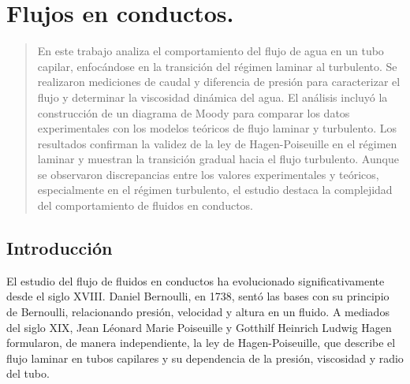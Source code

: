 



	
	\let\cleardoublepage\clearpage
	
	\frontmatter
	\tableofcontents

	
	\mainmatter
	\titleformat{\chapter}[display]
	{\normalfont\bfseries}{}{0pt}{\LARGE}
	\chapter{Flujos en conductos.}
	\begin{abstract}
	\vspace{0.5cm}
	\footnotesize{En este trabajo analiza el comportamiento del flujo de agua en un tubo capilar, enfocándose en la transición del régimen laminar al turbulento. Se realizaron mediciones de caudal y diferencia de presión para caracterizar el flujo y determinar la viscosidad dinámica del agua. El análisis incluyó la construcción de un diagrama de Moody para comparar los datos experimentales con los modelos teóricos de flujo laminar y turbulento. Los resultados confirman la validez de la ley de Hagen-Poiseuille en el régimen laminar y muestran la transición gradual hacia el flujo turbulento. Aunque se observaron discrepancias entre los valores experimentales y teóricos, especialmente en el régimen turbulento, el estudio destaca la complejidad del comportamiento de fluidos en conductos.}

	\end{abstract}
	\section{Introducción}
	
	El estudio del flujo de fluidos en conductos ha evolucionado significativamente desde el siglo XVIII. Daniel Bernoulli, en 1738, sentó las bases con su principio de Bernoulli, relacionando presión, velocidad y altura en un fluido. A mediados del siglo XIX, Jean Léonard Marie Poiseuille y Gotthilf Heinrich Ludwig Hagen formularon, de manera independiente, la ley de Hagen-Poiseuille, que describe el flujo laminar en tubos capilares y su dependencia de la presión, viscosidad y radio del tubo.
	
